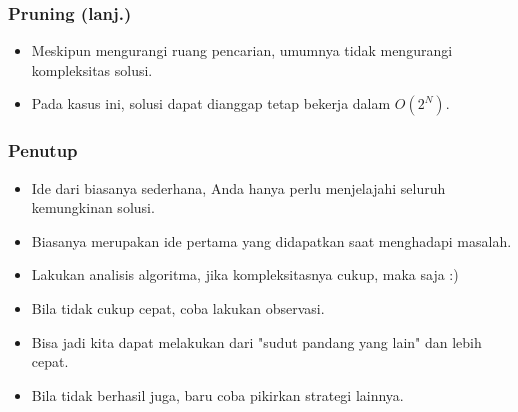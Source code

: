 \begin{frame}
\frametitle{Pruning (lanj.)}
\begin{itemize}
  \item Meskipun mengurangi ruang pencarian, \fpruning umumnya tidak mengurangi kompleksitas solusi.
  \item Pada kasus ini, solusi dapat dianggap tetap bekerja dalam $O(2^N)$.
\end{itemize}
\end{frame}

\begin{frame}
\frametitle{Penutup}
\begin{itemize}
  \item Ide dari \fBruteForce biasanya sederhana, Anda hanya perlu menjelajahi seluruh kemungkinan solusi.
  \item Biasanya merupakan ide pertama yang didapatkan saat menghadapi masalah.
  \item Lakukan analisis algoritma, jika kompleksitasnya cukup, maka \fBruteForce saja :)
  \item Bila tidak cukup cepat, coba lakukan observasi. 
  \item Bisa jadi kita dapat melakukan \fBruteForce dari "sudut pandang yang lain" dan lebih cepat.
  \item Bila tidak berhasil juga, baru coba pikirkan strategi lainnya.
\end{itemize}
\end{frame}


